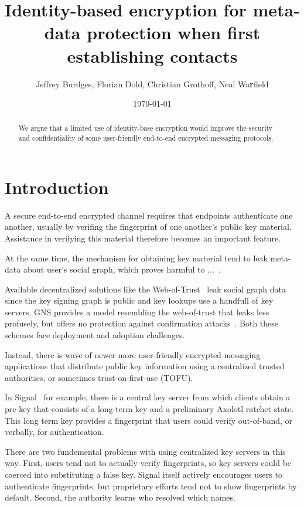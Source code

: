 \documentclass[twoside,letterpaper]{sig-alternate}
\title{Identity-based encryption for meta-data protection when first establishing contacts}
\author{Jeffrey Burdges, Florian Dold, Christian Grothoff, Neal Wa{\bf r}field}
\date{\today}
\begin{document}
\maketitle


\begin{abstract}
We argue that a limited use of identity-base encryption would improve
the security and confidentiality of some user-friendly end-to-end
encrypted messaging protocols.
\end{abstract}


\section{Introduction}


A secure end-to-end encrypted channel requires that endpoints
authenticate one another, usually by verifing the fingerprint of
one another's public key material.
Assistance in verifying this material therefore becomes an important
feature. %

At the same time, the mechanism for obtaining key material tend to
leak meta-data about user's social graph, which proves harmful to 
...~\cite{skynet,??metadatapolution??}.

Available decentralized solutions like the Web-of-Trust~\cite{wot}
leak social graph data since the key signing graph is public and
key lookups use a handfull of key servers.  GNS provides a model
resembling the web-of-trust that leaks less profusely, but offers
no protection against confirmation attacks~\cite{gns}.  
Both these schemes face deployment and adoption challenges.

Instead, there is wave of newer more user-friendly encrypted messaging
applications that distribute public key information using a centralized
trusted authorities, or sometimes trust-on-first-use (TOFU). 

In Signal~\cite{TextSecure} for example, there is a central key server
from which clients obtain a pre-key that consists of a long-term key
and a preliminary Axolotl ratchet state.  
This long term key provides a fingerprint that users could verify
out-of-band, or verbally, for authentication. 

There are two fundemental problems with using centralized key servers
in this way.  
First, users tend not to actually verify fingerprints, so 
key servers could be coerced into substituting a false key.
Signal itself actively encourages users to authenticate fingerprints,
but proprietary efforts tend not to show fingerprints by default.
Second, the authority learns who resolved which names.
\end{document}
